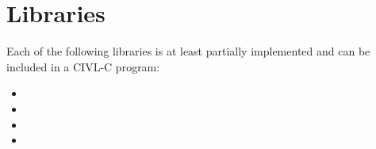 




\chapter{Libraries}

Each of the following libraries is at least partially implemented and can
be included in a CIVL-C program:
\begin{itemize}
\item {}
\item {}
\item {}
\item {}
\end{itemize}
